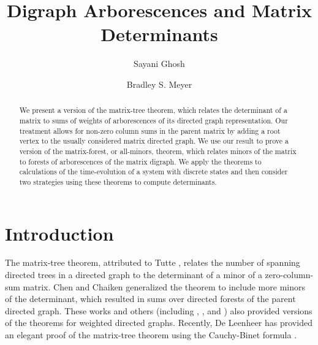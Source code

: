 \documentclass{article}
\begin{document}
\title{Digraph Arborescences and Matrix Determinants}

\author[1,2]{Sayani Ghosh}
\author[3]{Bradley S. Meyer}


\maketitle

\begin{abstract}
We present a version of the matrix-tree theorem, which relates the determinant of a matrix to sums of weights of arborescences of its directed graph representation.  Our treatment allows for non-zero column sums in the parent matrix by adding a root vertex to the usually considered matrix directed graph.  We use our result to prove a version of the matrix-forest, or all-minors, theorem, which relates minors of the matrix to forests of arborescences of the matrix digraph.  We apply the theorems to calculations of the time-evolution of a system with discrete states and then consider two strategies using these theorems to compute determinants.
\end{abstract}


\section{Introduction}

The matrix-tree theorem, attributed to Tutte \cite{tutte_1948}, relates the number of spanning directed trees in a directed graph to the determinant of a minor of a zero-column-sum matrix.
Chen \cite{chen2012applied} and Chaiken \cite{chaikenSeth} generalized the theorem to include more minors of the determinant, which resulted in sums over directed forests of the parent directed graph.  These works and others (including \cite{MOON1994163}, \cite{chebotarev2006matrixforest},  and \cite{tutte2001graph}) also provided versions of the theorems for weighted directed graphs.  Recently, De Leenheer has provided an elegant proof of the matrix-tree theorem using the Cauchy-Binet formula \cite{doi:10.1137/19M1265193}.
\end{document}

